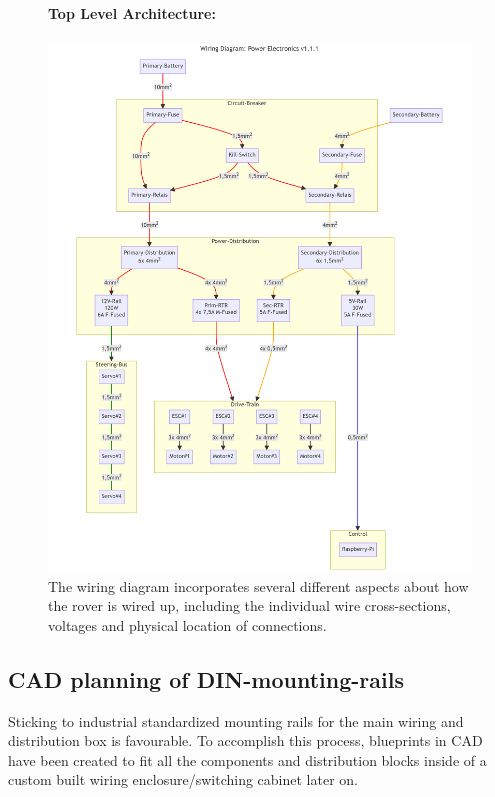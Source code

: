     \begin{figure}[ht!] %
        \paragraph{Top Level Architecture:}
        \centering
        \includegraphics[width=1\textwidth]{contents/figures/wiring-diagram-p-v1.1.1.png}
        \caption{The wiring diagram incorporates several different aspects about how the rover is wired up, including the individual wire cross-sections, voltages and physical location of connections.}
        \label{wiring_diagram}
    \end{figure}

    \clearpage %

    \subsection{CAD planning of DIN-mounting-rails}

    Sticking to industrial standardized mounting rails for the main wiring and distribution box is favourable. To accomplish this process, blueprints in CAD have been created to fit all the components and distribution blocks inside of a custom built wiring enclosure/switching cabinet later on. 

